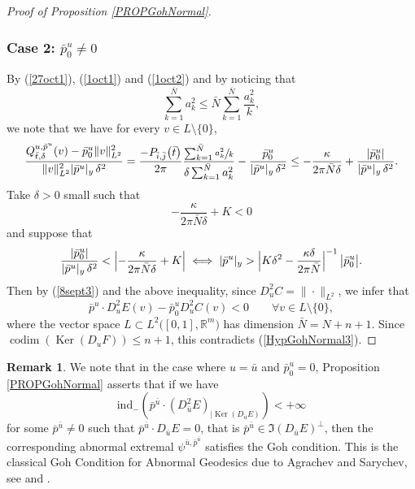 \documentclass[JEP,XML,SOM,Unicode,NoFloatCountersInSection,published]{cedram}
\DeclareMathOperator{\codim}{codim}
\DeclareMathOperator{\Ker}{Ker}
\newcommand\R{\mathbb R}
\theoremstyle{definition}
\newtheorem{remark}[theorem]{Remark}
\begin{document}
\begin{proof}[Proof of Proposition \ref{PROPGohNormal}]
\subsubsection*{Case 2: $\bar{p}_0^{u}\neq 0$}
By (\ref{27oct1}), (\ref{1oct1}) and (\ref{1oct2}) and by noticing that
\[
\sum_{k=1}^{\bar{N}} a_k^2 \leq \bar{N} \sum_{k=1}^{\bar{N}} \frac{a_k^2}{k},
\]
we note that we have for every $v\in L\setminus \{0\}$,
\[
\frac{Q^{u,\bar{p}^u}_{\bar{t},\delta}(v) - \bar{p}_0^u \|v\|_{L^2}^2}{\|v\|_{L^2}^2 |\bar{p}^u|_{y}\,\delta^2} = \frac{- P_{\bar{i},\bar{j}} \bigl(\bar{t}\bigr) }{2\pi} \frac{\sum_{k=1}^{\bar{N}} \sfrac{a_k^2}{k}}{ \delta \sum_{k=1}^{\bar{N}} a_k^2} - \frac{\bar{p}_0^u}{|\bar{p}^u|_{y}\,\delta^2} \leq -\frac{\kappa}{2\pi\bar{N}\delta} + \frac{\left|\bar{p}_0^u\right|}{|\bar{p}^u|_{y}\,\delta^2}.
\]
Take $\delta>0$ small such that
\[
- \frac{\kappa}{2\pi \bar{N}\delta} +K <0
\]
and suppose that
\[
\frac{\left|\bar{p}_0^u\right|}{|\bar{p}^u|_{y}\,\delta^2}< \Bigl| - \frac{\kappa }{2\pi \bar{N}\delta} +K\Bigr| \iff |\bar{p}^u|_y > \Bigl| K\delta^2 - \frac{\kappa \delta}{2\pi \bar{N}} \Bigr|^{-1} \, \bigl| \bar{p}_0^u\bigr|.
\]
Then by (\ref{8sept3}) and the above inequality, since $D^2_uC=\|\cdot\|_{L^2}$, we infer that
\[
\bar{p}^u \cdot D_{u}^2 E (v) - \bar{p}_0^u D_u^2C(v)< 0 \qquad \forall v \in L\setminus\{0\},
\]
where the vector space $L\subset L^2\bigl([0,1],\R^m\bigr)$ has dimension $\bar{N}=N+n+1$. Since $\codim(\Ker (D_{u}F))\leq n+1$, this contradicts (\ref{HypGohNormal3}).
\end{proof}

\begin{remark}\label{20oct1}
We note that in the case where $u=\bar{u}$ and $\bar{p}_0^u=0$, Proposition \ref{PROPGohNormal} asserts that if we have
\begin{equation*}
\mathrm{ind}_- \left(\bar{p}^{\bar{u}} \cdot \left(D^2_{\bar{u}} E \right)_{\vert \Ker (D_{\bar{u}}E)} \right) < +\infty
\end{equation*}
for some $ \bar{p}^{\bar{u}}\neq 0$ such that $\bar{p}^{\bar{u}} \cdot D_{\bar{u}} E =0$, that is $\bar{p}^{\bar{u}}\in \Im(D_{\bar{u}}E)^{\perp}$, then the corresponding abnormal extremal $\psi^{\bar{u},\bar{p}^{\bar{u}}}$ satisfies the Goh condition. This is the classical Goh Condition for Abnormal Geodesics due to Agrachev and Sarychev, see \cite[Prop.\,3.6, p.\,389]{as99} and \cite[Th.\,2.20, p.\,61]{riffordbook}.
\end{remark}
\end{document}
